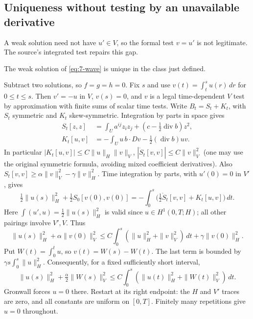 \subsection{Uniqueness without testing by an unavailable derivative}
A weak solution need not have $u'\in V$, so the formal test $v=u'$ is
not legitimate. The source's integrated test repairs this gap.
\Needspace{55mm}
\begin{theorem}
\label{thm:7-wave-unique}
The weak solution of \eqref{eq:7-wave} is unique in the class just defined.
\end{theorem}
\begin{expandedproof}
Subtract two solutions, so $f=g=h=0$. Fix $s$ and use
$v(t)=\int_t^s u(r)\,dr$ for $0\leq t\leq s$. Then $v'=-u$ in $V$,
$v(s)=0$, and $v$ is a legal time-dependent $V$ test by approximation
with finite sums of scalar time tests.
Write $B_t=S_t+K_t$, with $S_t$ symmetric and $K_t$ skew-symmetric.
Integration by parts in space gives
\[
 \begin{split}
 S_t[z,z]&=\int_U a^{ij}z_i z_j+(c-\tfrac12\operatorname{div}b)z^2,\\
 K_t[u,v]&=-\int_Uu\,b\cdot Dv-\tfrac12(\operatorname{div}b)uv.
 \end{split}
\]
In particular $|K_t[u,v]|\leq C\|u\|_H\|v\|_V$,
$|\dot S_t[v,v]|\leq C\|v\|_V^2$ (one may use the original symmetric
formula, avoiding mixed coefficient derivatives).
Also $S_t[v,v]\geq\alpha\|v\|_V^2-\gamma\|v\|_H^2$.
Time integration by parts, with $u'(0)=0$ in $V'$, gives
\[
 \tfrac12\|u(s)\|_H^2+\tfrac12 S_0[v(0),v(0)]
 =-\int_0^s\big(\tfrac12\dot S_t[v,v]+K_t[u,v]\big)\,dt.
\]
Here $\int(u',u)=\frac12\|u(s)\|_H^2$ is valid since $u\in H^1(0,T;H)$;
all other pairings involve $V',V$.
Thus
\[
 \|u(s)\|_H^2+\alpha\|v(0)\|_V^2
 \leq C\int_0^s(\|u\|_H^2+\|v\|_V^2)\,dt+\gamma\|v(0)\|_H^2.
\]
Put $W(t)=\int_0^t u$, so $v(t)=W(s)-W(t)$.
The last term is bounded by $\gamma s\int_0^s\|u\|_H^2$.
Consequently, for a fixed sufficiently short interval,
\[
 \|u(s)\|_H^2+\tfrac\alpha2\|W(s)\|_V^2
 \leq C\int_0^s(\|u(t)\|_H^2+\|W(t)\|_V^2)\,dt.
\]
Gronwall forces $u=0$ there. Restart at its right endpoint: the $H$ and
$V'$ traces are zero, and all constants are uniform on $[0,T]$.
Finitely many repetitions give $u=0$ throughout.
\end{expandedproof}
\Needspace{55mm}


